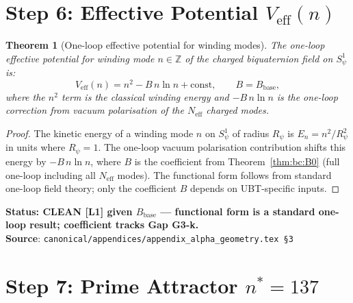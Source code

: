 \documentclass[12pt,a4paper]{article}
\newtheorem{theorem}{Theorem}[section]
\theoremstyle{definition}
\theoremstyle{remark}
\begin{document}
\section{Step 6: Effective Potential $V_{\mathrm{eff}}(n)$}
\label{sec:bc:Veff}

\begin{theorem}[One-loop effective potential for winding modes]
\label{thm:bc:Veff}
The one-loop effective potential for winding mode $n \in \mathbb{Z}$ of the
charged biquaternion field on $S^1_\psi$ is:
\begin{equation}
  V_{\mathrm{eff}}(n) = n^2 - B\,n\ln n + \mathrm{const},
  \qquad B = B_{\mathrm{base}},
  \label{eq:bc:Veff}
\end{equation}
where the $n^2$ term is the classical winding energy and $-B\,n\ln n$ is the
one-loop correction from vacuum polarisation of the $N_{\mathrm{eff}}$ charged modes.
\end{theorem}

\begin{proof}
The kinetic energy of a winding mode $n$ on $S^1_\psi$ of radius $R_\psi$ is
$E_n = n^2/R_\psi^2$ in units where $R_\psi = 1$.  The one-loop vacuum
polarisation contribution shifts this energy by $-B\,n\ln n$, where $B$ is
the coefficient from Theorem~\ref{thm:bc:B0} (full one-loop including all
$N_{\mathrm{eff}}$ modes).  The functional form follows from standard one-loop
field theory; only the coefficient $B$ depends on UBT-specific inputs.
\end{proof}

\begin{resultbox}
\textbf{Status: CLEAN [L1] given $B_{\mathrm{base}}$ — functional form is a
standard one-loop result; coefficient tracks Gap G3-k.}\\
\textbf{Source}: \texttt{canonical/appendices/appendix\_alpha\_geometry.tex \S3}
\end{resultbox}

\section{Step 7: Prime Attractor $n^* = 137$}
\label{sec:bc:nstar}
\end{document}
